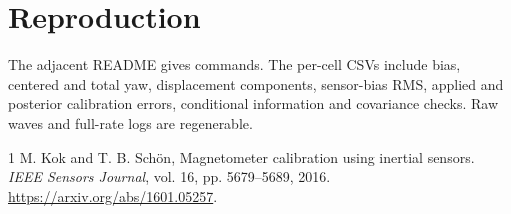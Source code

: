 \documentclass[conference]{IEEEtran}
\begin{document}
\section{Reproduction}
The adjacent README gives commands. The per-cell CSVs include bias, centered and total yaw, displacement components, sensor-bias RMS, applied and posterior calibration errors, conditional information and covariance checks. Raw waves and full-rate logs are regenerable.
\begin{thebibliography}{1}
 M. Kok and T. B. Sch\"on, Magnetometer calibration using inertial sensors. \emph{IEEE Sensors Journal}, vol. 16, pp. 5679--5689, 2016. \url{https://arxiv.org/abs/1601.05257}.
\end{thebibliography}
\end{document}
